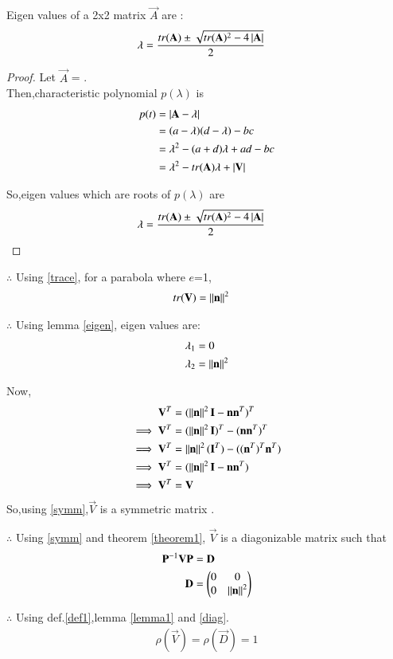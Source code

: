 \documentclass[journal,12pt,twocolumn]{IEEEtran}
\begin{document}
\begin{lemma}
\label{eigen}
Eigen values of a 2x2 matrix $\vec{A}$ are :
\begin{align}
    \lambda &= \frac{tr(\mathbf{A}) \pm \sqrt{tr(\mathbf{A})^{2}-4\left\vert\mathbf{A}\right\vert}}{2}
\end{align}
\end{lemma}
\begin{proof}
Let $\vec{A}$ = .
\\
Then,characteristic polynomial $p(\lambda)$ is
\begin{align}
    p(t) &= \left\vert\mathbf{A-\lambda}\right\vert
    \\
    &= (a-\lambda)(d-\lambda)-bc
    \\
    &= \lambda^2 -(a+d)\lambda + ad-bc
    \\
    &= \lambda^2 -tr(\mathbf{A})\lambda + \left\vert\mathbf{V}\right\vert
\end{align}

So,eigen values which are roots of $p(\lambda)$ are
\begin{align}
    \lambda &= \frac{tr(\mathbf{A}) \pm \sqrt{tr(\mathbf{A})^{2}-4\left\vert\mathbf{A}\right\vert}}{2}
\end{align}

\end{proof}

$\therefore$ Using \eqref{trace}, for a parabola where $e$=1,
\begin{align}
    tr(\mathbf{V}) &=\left\lVert\mathbf{n}\right\rVert^2
\end{align}

$\therefore$ Using lemma \ref{eigen}, eigen values are:
\begin{align}
    \lambda_1 &= 0
    \\
    \lambda_2 &= \left\lVert\mathbf{n}\right\rVert^2
\end{align}

Now,
\begin{align}
    \mathbf{V}^T &= (\left\lVert\mathbf{n}\right\rVert^2\mathbf{I}-\mathbf{n}\mathbf{n}^T)^T
    \\
    \implies \mathbf{V}^T &= (\left\lVert\mathbf{n}\right\rVert^2\mathbf{I})^T-(\mathbf{n}\mathbf{n}^T)^T
    \\
    \implies \mathbf{V}^T &= \left\lVert\mathbf{n}\right\rVert^2(\mathbf{I}^T) - ((\mathbf{n}^T)^T\mathbf{n}^T)
    \\
    \implies \mathbf{V}^T &= (\left\lVert\mathbf{n}\right\rVert^2\mathbf{I}-\mathbf{n}\mathbf{n}^T)
    \\
    \implies \mathbf{V}^T &= \mathbf{V}    \label{symm}
\end{align}
So,using \eqref{symm},$\vec{V}$ is a symmetric matrix .


$\therefore$ Using \eqref{symm} and theorem \ref{theorem1}, $\vec{V}$ is a diagonizable matrix such that
\begin{align}
    \mathbf{P}^{-1}\mathbf{V}\mathbf{P} &= \mathbf{D} 
    \\
    \mathbf{D} &= \begin{pmatrix}0 & 0 \\ 0 & \left\lVert\mathbf{n}\right\rVert^2\end{pmatrix} \label{diag}
\end{align}

$\therefore$
Using def.\ref{def1},lemma \ref{lemma1} and \eqref{diag}.
\begin{align}
    \rho(\vec{V}) = \rho(\vec{D}) = 1
\end{align}
\end{document}

